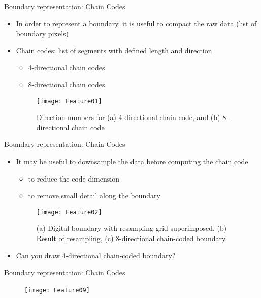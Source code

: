 \begin{frame}{Boundary representation: Chain Codes}
\begin{itemize}
\item In order to represent a boundary, it is useful to compact the raw data ({\color{mycolor2}list of boundary pixels})
\item {\color{mycolor1}Chain codes:} list of segments with defined length and direction
\begin{itemize}
\item 4-directional chain codes
\item 8-directional chain codes
\end{itemize}
\begin{figure}
\texttt{[image: Feature01]}
\caption{Direction numbers for (a) 4-directional chain code, and (b) 8-directional chain code}
\end{figure}
\end{itemize}
\end{frame}

\begin{frame}{Boundary representation: Chain Codes}
\begin{itemize}
\item It may be useful to downsample the data before computing the chain code
\begin{itemize}
\item to reduce the code dimension
\item to remove small detail along the boundary
\end{itemize}
\begin{figure}
\texttt{[image: Feature02]}
\caption{(a) Digital boundary with resampling grid superimposed, (b) Result of resampling, (c) 8-directional chain-coded boundary.}
\end{figure}
\item Can you draw 4-directional chain-coded boundary?
\end{itemize}
\end{frame}

\begin{frame}{Boundary representation: Chain Codes}
\vspace{2.3cm}
\begin{figure}
\texttt{[image: Feature09]}~~~
\end{figure}
\end{frame}

